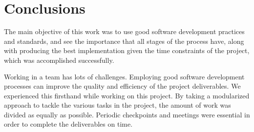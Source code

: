 \documentclass[12pt,a4paper]{article}
\begin{document}
%
%
%
%
%
%
%
%
%
%
%
%
%
%
%
%
%


%			
%
%


\section{Conclusions}

The main objective of this work was to use good software development practices and standards, and see the importance that all stages of the process have, along with producing the best implementation given the time constraints of the project, which was accomplished successfully. 

Working in a team has lots of challenges. Employing good software development processes can improve the quality and efficiency of the project deliverables. We experienced this firsthand while working on this project. By taking a modularized approach to tackle the various tasks in the project, the amount of work was divided as equally as possible. Periodic checkpoints and meetings were essential in order to complete the deliverables on time. 
\end{document}
